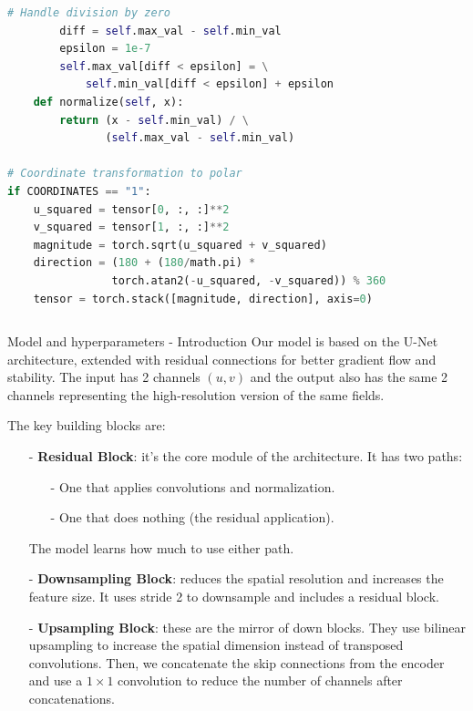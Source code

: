 \documentclass[footline=authortitle]{beamer}
\begin{document}
\begin{frame}[fragile]
\begin{columns}
\begin{column}{0.6\textwidth}
\begin{lstlisting}[language=Python, basicstyle=\ttfamily\tiny]
        # Handle division by zero
        diff = self.max_val - self.min_val
        epsilon = 1e-7
        self.max_val[diff < epsilon] = \
            self.min_val[diff < epsilon] + epsilon
    def normalize(self, x):
        return (x - self.min_val) / \
               (self.max_val - self.min_val)

# Coordinate transformation to polar
if COORDINATES == "1":
    u_squared = tensor[0, :, :]**2
    v_squared = tensor[1, :, :]**2
    magnitude = torch.sqrt(u_squared + v_squared)
    direction = (180 + (180/math.pi) * 
                torch.atan2(-u_squared, -v_squared)) % 360
    tensor = torch.stack([magnitude, direction], axis=0)
\end{lstlisting}
\end{column}
\end{columns}

\end{frame}

\begin{frame}{Model and hyperparameters - Introduction}
\justifying
\footnotesize
    Our model is based on the U-Net architecture, extended with residual connections for better gradient flow and stability.
    The input has 2 channels $(u,v)$ and the output also has the same 2 channels representing the high-resolution version of the same fields.

    The key building blocks are:
    \begin{itemize}
    \justifying
        \item[-] \textbf{Residual Block}: it's the core module of the architecture. It has two paths:\begin{itemize}
            \item[-] One that applies convolutions and normalization.
            \item[-] One that does nothing (the residual application).
        \end{itemize}
        The model learns how much to use either path.
        \item[-] \textbf{Downsampling Block}: reduces the spatial resolution and increases the feature size. It uses stride 2 to downsample and includes a residual block.
        \item[-] \textbf{Upsampling Block}: these are the mirror of down blocks. They use bilinear upsampling to increase the spatial dimension instead of transposed convolutions. Then, we concatenate  the skip connections from the encoder and use a $1\times 1$ convolution to reduce the number of channels after concatenations.
    \end{itemize}
    \end{frame}
\end{document}
